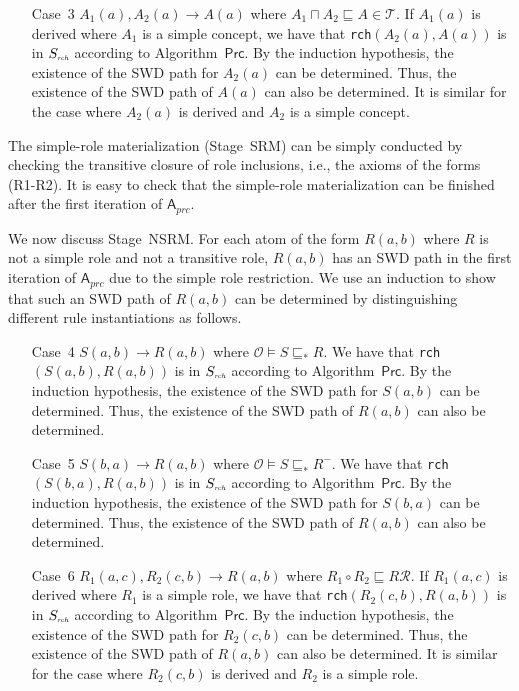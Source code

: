 \begin{enumerate}[leftmargin=12ex]
\item[Case~3] $A_1(a),A_2(a)\rightarrow A(a)$ where $A_1\sqcap A_2\sqsubseteq A\in\mathcal{T}$.
    If $A_1(a)$ is derived where $A_1$ is a simple concept,
    we have that \texttt{rch}$(A_2(a),A(a))$ is in $S_{\textit{\tiny rch}}$
    according to Algorithm~$\mathsf{Prc}$.
    By the induction hypothesis, the existence of the SWD path for $A_2(a)$ can be determined.
    Thus, the existence of the SWD path of $A(a)$ can also be determined.
    It is similar for the case where $A_2(a)$ is derived and $A_2$ is a simple concept.
\end{enumerate}

The simple-role materialization (Stage~SRM) can be simply conducted by checking the transitive closure
of role inclusions, i.e., the axioms of the forms (R1-R2).
It is easy to check that the simple-role materialization can be finished after the
first iteration of $\mathsf{A}_{prc}$.

We now discuss Stage~NSRM. For each atom of the form $R(a,b)$ where $R$ is not a simple role
and not a transitive role,
$R(a,b)$ has an SWD path in the first iteration of $\mathsf{A}_{prc}$ due to the simple role restriction.
We use an induction to show that
such an SWD path of $R(a,b)$ can be determined by distinguishing different rule instantiations
as follows.

\begin{enumerate}[leftmargin=12ex]
\item[Case~4] $S(a,b)\rightarrow R(a,b)$ where $\mathcal{O}\models S\sqsubseteq_* R$.
    We have that \texttt{rch}$(S(a,b),R(a,b))$ is in $S_{\textit{\tiny rch}}$
    according to Algorithm~$\mathsf{Prc}$.
    By the induction hypothesis, the existence of the SWD path for $S(a,b)$ can be determined.
    Thus, the existence of the SWD path of $R(a,b)$ can also be determined.

\item[Case~5] $S(b,a)\rightarrow R(a,b)$ where $\mathcal{O}\models S\sqsubseteq_* R^-$.
    We have that \texttt{rch}$(S(b,a),R(a,b))$ is in $S_{\textit{\tiny rch}}$
    according to Algorithm~$\mathsf{Prc}$.
    By the induction hypothesis, the existence of the SWD path for $S(b,a)$ can be determined.
    Thus, the existence of the SWD path of $R(a,b)$ can also be determined.

\item[Case~6] $R_1(a,c),R_2(c,b)\rightarrow R(a,b)$ where $R_1\circ R_2\sqsubseteq R\mathcal{R}$.
    If $R_1(a,c)$ is derived where $R_1$ is a simple role,
    we have that \texttt{rch}$(R_2(c,b),R(a,b))$ is in $S_{\textit{\tiny rch}}$
    according to Algorithm~$\mathsf{Prc}$.
    By the induction hypothesis, the existence of the SWD path for $R_2(c,b)$ can be determined.
    Thus, the existence of the SWD path of $R(a,b)$ can also be determined.
    It is similar for the case where $R_2(c,b)$ is derived and $R_2$ is a simple role.
\end{enumerate}

